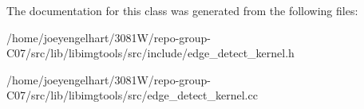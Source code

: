The documentation for this class was generated from the following files\+:\begin{DoxyCompactItemize}
\item 
/home/joeyengelhart/3081\+W/repo-\/group-\/\+C07/src/lib/libimgtools/src/include/edge\+\_\+detect\+\_\+kernel.\+h\item 
/home/joeyengelhart/3081\+W/repo-\/group-\/\+C07/src/lib/libimgtools/src/edge\+\_\+detect\+\_\+kernel.\+cc\end{DoxyCompactItemize}
